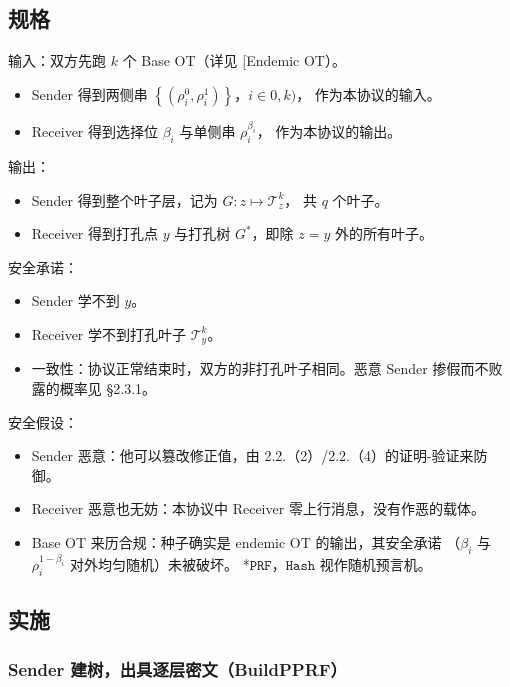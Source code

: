 \subsection{规格}

输入：双方先跑 $k$ 个 Base OT（详见 {[}Endemic OT）。

\begin{itemize}
\item
  Sender
  得到两侧串 $\left\{\left(\rho_i^0, \rho_i^1\right)\right\}$，$i\in0, k)$，
  作为本协议的输入。
\item
  Receiver 得到选择位 $\beta_i$ 与单侧串 $\rho_i^{\beta_i}$，
  作为本协议的输出。
\end{itemize}

输出：

\begin{itemize}
\item
  Sender 得到整个叶子层，记为 $G: z \mapsto \mathcal{T}^k_z$，
  共 $q$ 个叶子。
\item
  Receiver 得到打孔点 $y$ 与打孔树 $G^*$，即除 $z = y$ 外的所有叶子。
\end{itemize}

安全承诺：

\begin{itemize}
\item
  Sender 学不到 $y$。
\item
  Receiver 学不到打孔叶子 $\mathcal{T}^k_y$。
\item
  一致性：协议正常结束时，双方的非打孔叶子相同。恶意 Sender
  掺假而不败露的概率见 §2.3.1。
\end{itemize}

安全假设：

\begin{itemize}
\item
  Sender 恶意：他可以篡改修正值，由 2.2.（2）/2.2.（4）的证明-验证来防御。
\item
  Receiver 恶意也无妨：本协议中 Receiver 零上行消息，没有作恶的载体。
\item
  Base OT 来历合规：种子确实是 endemic OT 的输出，其安全承诺
（$\beta_i$ 与 $\rho_i^{1-\beta_i}$ 对外均匀随机）未被破坏。
  *$\mathtt{PRF}$，$\mathtt{Hash}$ 视作随机预言机。
\end{itemize}

\subsection{实施}
\subsubsection{Sender 建树，出具逐层密文（BuildPPRF）}

